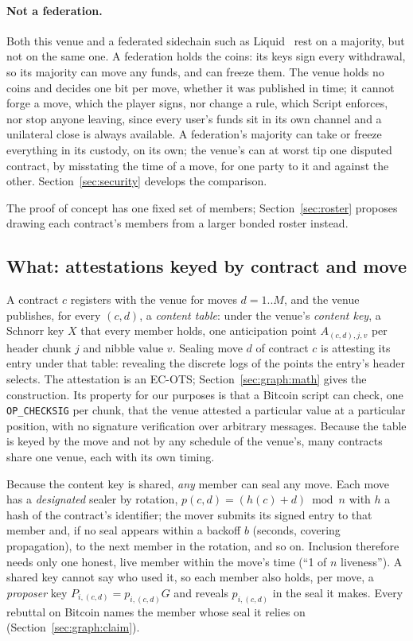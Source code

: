 \documentclass[11pt]{article}
\newcommand{\op}[1]{\texttt{OP\_#1}}
\begin{document}
\paragraph{Not a federation.} Both this venue and a federated sidechain
such as Liquid~\cite{liquid} rest on a majority, but not on the same one. A federation
holds the coins: its keys sign every withdrawal, so its majority can
move any funds, and can freeze them. The venue holds no coins and
decides one bit per move, whether it was published in time; it cannot
forge a move, which the player signs, nor change a rule, which Script
enforces, nor stop anyone leaving, since every user's funds sit in its
own channel and a unilateral close is always available. A federation's
majority can take or freeze everything in its custody, on its own; the
venue's can at worst tip one disputed contract, by misstating the time
of a move, for one party to it and against the other.
Section~\ref{sec:security} develops the comparison.

The proof of concept has one fixed set of members;
Section~\ref{sec:roster} proposes drawing each contract's members from
a larger bonded roster instead.

\subsection{What: attestations keyed by contract and move}

A contract $c$ registers with the venue for moves $d = 1..M$, and the
venue publishes, for every $(c, d)$, a \emph{content table}: under the
venue's \emph{content key}, a Schnorr key $X$ that every member holds,
one anticipation point $A_{(c,d),j,v}$ per header chunk $j$ and nibble
value $v$. Sealing move $d$ of contract $c$ is attesting its entry under
that table: revealing the discrete logs of the points the entry's
header selects. The attestation is an EC-OTS; Section~\ref{sec:graph:math}
gives the construction. Its property for our purposes is that a Bitcoin
script can check, one \op{CHECKSIG} per chunk, that the venue attested a
particular value at a particular position, with no signature
verification over arbitrary messages. Because the table is keyed by the
move and not by any schedule of the venue's, many contracts share one
venue, each with its own timing.

Because the content key is shared, \emph{any} member can seal any move.
Each move has a \emph{designated} sealer by rotation,
$p(c,d) = (h(c) + d) \bmod n$ with $h$ a hash of the contract's
identifier; the mover submits its signed entry to that member and, if no
seal appears within a backoff $b$ (seconds, covering propagation), to the
next member in the rotation, and so on. Inclusion therefore needs only
one honest, live member within the move's time (``1 of $n$ liveness'').
A shared key cannot say who used it, so each member also holds, per
move, a \emph{proposer} key $P_{i,(c,d)} = p_{i,(c,d)}G$ and reveals
$p_{i,(c,d)}$ in the seal it makes. Every rebuttal on Bitcoin names the
member whose seal it relies on (Section~\ref{sec:graph:claim}).
\end{document}
